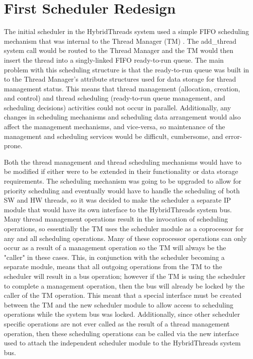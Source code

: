 \section{First Scheduler Redesign} \label{sec:build1} The initial scheduler in
the HybridThreads system used a simple FIFO scheduling mechanism that was
internal to the Thread Manager (TM) \cite{Andrews:2004wu}.  The add\_thread
system call would be routed to the Thread Manager and the TM would then insert
the thread into a singly-linked FIFO ready-to-run queue.  The main problem with
this scheduling structure is that the ready-to-run queue was built in to the
Thread Manager's attribute structures used for data storage for thread
management status.  This means that thread management (allocation, creation,
and control) and thread scheduling (ready-to-run queue management, and
scheduling decisions) activities could not occur in parallel.  Additionally,
any changes in scheduling mechanisms and scheduling data arrangement would also
affect the management mechanisms, and vice-versa, so maintenance of the
management and scheduling services would be difficult, cumbersome, and
error-prone.

Both the thread management and thread scheduling mechanisms would have to be
modified if either were to be extended in their functionality or data storage
requirements.  The scheduling mechanism was going to be upgraded to allow for
priority scheduling and eventually would have to handle the scheduling of both
SW and HW threads, so it was decided to make the scheduler a separate IP module
that would have its own interface to the HybridThreads system bus.  Many thread
management operations result in the invocation of scheduling operations, so
essentially the TM uses the scheduler module as a coprocessor for any and all
scheduling operations.  Many of these coprocessor operations can only occur as
a result of a management operation so the TM will always be the "caller" in
these cases.  This, in conjunction with the scheduler becoming a separate
module, means that all outgoing operations from the TM to the scheduler will
result in a bus operation; however if the TM is using the scheduler to complete
a management operation, then the bus will already be locked by the caller of
the TM operation.  This meant that a special interface must be
created between the TM and the new scheduler module to allow access to
scheduling operations while the system bus was locked.  Additionally, since
other scheduler specific operations are not ever called as the result of a thread
management operation, then these scheduling operations can be called via the
new interface used to attach the independent scheduler module to the
HybridThreads system bus.

